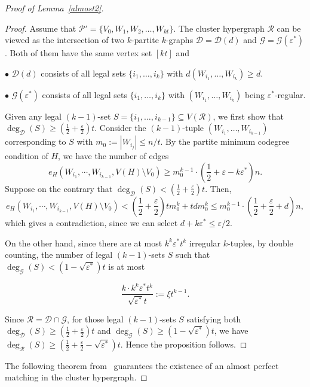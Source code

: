 \documentclass[11pt,a4paper]{article}
\theoremstyle{definition}
\begin{document}
\begin{proof}[Proof of Lemma~\ref{almost2}]
\begin{proof}
    Assume that $\mathcal{P}'=\{V_0, W_1, W_2,\dots ,W_{kt}\}$. The cluster hypergraph $\mathcal{R}$ can be viewed as the intersection of two $k$-partite $k$-graphs $\mathcal{D}=\mathcal{D}(d)$ and $\mathcal{G}=\mathcal{G}(\varepsilon^*)$. Both of them have the same vertex set $[kt]$ and

    $\bullet$ $\mathcal{D}(d)$ consists of all legal sets $\{i_1,\dots ,i_k\}$ with $d(W_{i_1},\dots ,W_{i_k})\geq d.$

    $\bullet$ $\mathcal{G}(\varepsilon^*)$ consists of all legal sets $\{i_1,\dots ,i_k\}$ with $(W_{i_1},\dots ,W_{i_k})$ being $\varepsilon^*$-regular.

    Given any legal $(k-1)$-set $S=\{i_1,\dots ,i_{k-1}\}\subseteq V(\mathcal{R})$, we first show that $\deg_{\mathcal{D}}(S)\geq (\frac{1}{2}+\frac{\varepsilon}{2})t$. Consider the $(k-1)$-tuple $(W_{i_1},\dots ,W_{i_{k-1}})$ corresponding to $S$ with $m_0:=|W_{i_j}|\leq n/t$. By the partite minimum codegree condition of $H$, we have the number of edges 
    $$e_H(W_{i_1},\cdots ,W_{i_{k-1}}, V(H)\setminus V_0)\geq m_0^{k-1}\cdot (\frac{1}{2}+\varepsilon-k\varepsilon^*)n.$$
    Suppose on the contrary that $\deg_{\mathcal{D}}(S)< (\frac{1}{2}+\frac{\varepsilon}{2})t$. Then,
    $$e_H(W_{i_1},\cdots ,W_{i_{k-1}}, V(H)\setminus V_0)<(\frac{1}{2}+\frac{\varepsilon}{2})tm_0^k+tdm_0^k\leq m_0^{k-1}\cdot (\frac{1}{2}+\frac{\varepsilon}{2}+d)n,$$
    which gives a contradiction, since we can select $d+k\varepsilon^*\leq \varepsilon/2$.

    On the other hand, since there are at most $k^k\varepsilon^*t^k$ irregular $k$-tuples, by double counting, the number of legal $(k-1)$-sets $S$ such that $\deg_{\mathcal{G}}(S)<(1-\sqrt{\varepsilon^*})t$ is at most

    $$\frac{k\cdot k^k\varepsilon^*t^k}{\sqrt{\varepsilon^*}t}:=\xi t^{k-1}.$$

    Since $\mathcal{R}=\mathcal{D}\cap \mathcal{G}$, for those legal $(k-1)$-sets $S$ satisfying both $\deg_{\mathcal{D}}(S)\geq (\frac{1}{2}+\frac{\varepsilon}{2})t$ and $\deg_{\mathcal{G}}(S)\geq (1-\sqrt{\varepsilon^*})t$, we have $\deg_{\mathcal{R}}(S)\geq (\frac{1}{2}+\frac{\varepsilon}{2}-\sqrt{\varepsilon^*})t$. Hence the proposition follows.

\end{proof}

The following theorem from~\cite{KuhD} guarantees the existence of  an almost perfect matching in the cluster hypergraph. 


\end{proof}
\end{document}
